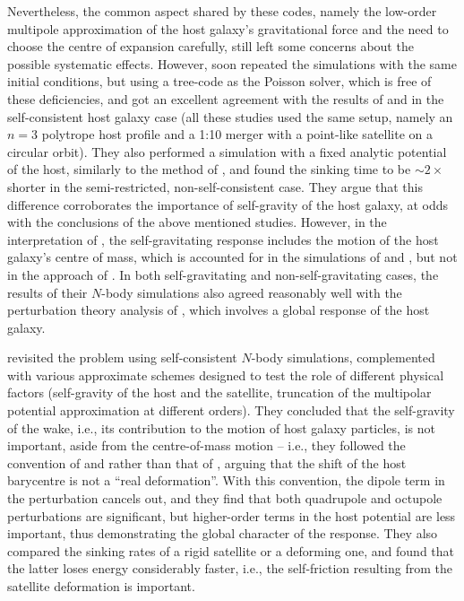 \documentclass[twocolumn]{aastex63}
\begin{document}
Nevertheless, the common aspect shared by these codes, namely the low-order multipole approximation of the host galaxy's gravitational force and the need to choose the centre of expansion carefully, still left some concerns about the possible systematic effects. However, \citet{Hernquist1989} soon repeated the simulations with the same initial conditions, but using a tree-code as the Poisson solver, which is free of these deficiencies, and got an excellent agreement with the results of \citet{Bontekoe1987} and \citet{Zaritsky1988} in the self-consistent host galaxy case (all these studies used the same setup, namely an $n=3$ polytrope host profile and a 1:10 merger with a point-like satellite on a circular orbit). They also performed a simulation with a fixed analytic potential of the host, similarly to the method of \citet{Lin1983}, and found the sinking time to be $\sim 2\times$ shorter in the semi-restricted, non-self-consistent case. They argue that this difference corroborates the importance of self-gravity of the host galaxy, at odds with the conclusions of the above mentioned studies. However, in the interpretation of \citet{Hernquist1989}, the self-gravitating response includes the motion of the host galaxy's centre of mass, which is accounted for in the simulations of \citet{Bontekoe1987} and \citet{Zaritsky1988}, but not in the approach of \citet{Lin1983}. In both self-gravitating and non-self-gravitating cases, the results of their $N$-body simulations also agreed reasonably well with the perturbation theory analysis of \citet{Weinberg1986,Weinberg1989}, which involves a global response of the host galaxy.

\citet{Prugniel1992} revisited the problem using self-consistent $N$-body simulations, complemented with various approximate schemes designed to test the role of different physical factors (self-gravity of the host and the satellite, truncation of the multipolar potential approximation at different orders). They concluded that the self-gravity of the wake, i.e., its contribution to the motion of host galaxy particles, is not important, aside from the centre-of-mass motion -- i.e., they followed the convention of \citet{Bontekoe1987} and \citet{Zaritsky1988} rather than that of \citet{Hernquist1989}, arguing that the shift of the host barycentre is not a ``real deformation''. With this convention, the dipole term in the perturbation cancels out, and they find that both quadrupole and octupole perturbations are significant, but higher-order terms in the host potential are less important, thus demonstrating the global character of the response. They also compared the sinking rates of a rigid satellite or a deforming one, and found that the latter loses energy considerably faster, i.e., the self-friction resulting from the satellite deformation is important.
\end{document}
